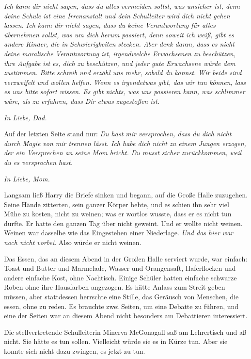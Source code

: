 \emph{Ich kann dir nicht sagen, dass du alles vermeiden sollst, was unsicher
ist, denn deine Schule ist eine Irrenanstalt und dein Schulleiter wird dich
nicht gehen lassen. Ich kann dir nicht sagen, dass du keine Verantwortung für
alles übernehmen sollst, was um dich herum passiert, denn soweit ich weiß, gibt
es andere Kinder, die in Schwierigkeiten} \emph{stecken. Aber denk daran, dass
es nicht deine moralische Verantwortung ist, irgendwelche Erwachsenen zu
beschützen, ihre Aufgabe ist es, dich zu beschützen, und jeder gute Erwachsene
würde dem zustimmen. Bitte schreib und erzähl uns mehr, sobald du kannst. Wir
beide sind verzweifelt und wollen helfen. Wenn es irgendetwas gibt, das wir tun
können, lass es uns bitte sofort wissen. Es gibt nichts, was uns passieren kann,
was schlimmer wäre, als zu erfahren, dass Dir etwas zugestoßen ist.}

\emph{In Liebe, Dad.}

Auf der letzten Seite stand nur: \emph{Du hast mir versprochen, dass du dich
nicht durch Magie von mir trennen lässt. Ich habe dich nicht zu einem Jungen
erzogen, der ein Versprechen an seine Mom bricht. Du musst sicher zurückkommen,
weil du es versprochen hast.}

\emph{In Liebe, Mom.}

Langsam ließ Harry die Briefe sinken und begann, auf die Große Halle zuzugehen.
Seine Hände zitterten, sein ganzer Körper bebte, und es schien ihn sehr viel
Mühe zu kosten, nicht zu weinen; was er wortlos wusste, dass er es nicht tun
durfte. Er hatte den ganzen Tag über nicht geweint. Und er wollte nicht weinen.
Weinen war dasselbe wie das Eingestehen einer Niederlage. \emph{Und das hier war
noch nicht vorbei}. Also würde er nicht weinen.

Das Essen, das an diesem Abend in der Großen Halle serviert wurde, war einfach:
Toast und Butter und Marmelade, Wasser und Orangensaft, Haferflocken und andere
einfache Kost, ohne Nachtisch. Einige Schüler hatten einfache schwarze Roben
ohne ihre Hausfarben angezogen. Es hätte Anlass zum Streit geben müssen, aber
stattdessen herrschte eine Stille, das Geräusch von Menschen, die essen, ohne zu
reden. Es brauchte zwei Seiten, um eine Debatte zu führen, und eine der Seiten
war an diesem Abend nicht besonders am Debattieren interessiert.

Die stellvertretende Schulleiterin Minerva McGonagall saß am Lehrertisch und aß
nicht. Sie hätte es tun sollen. Vielleicht würde sie es in Kürze tun. Aber sie
konnte sich nicht dazu zwingen, es jetzt zu tun.

